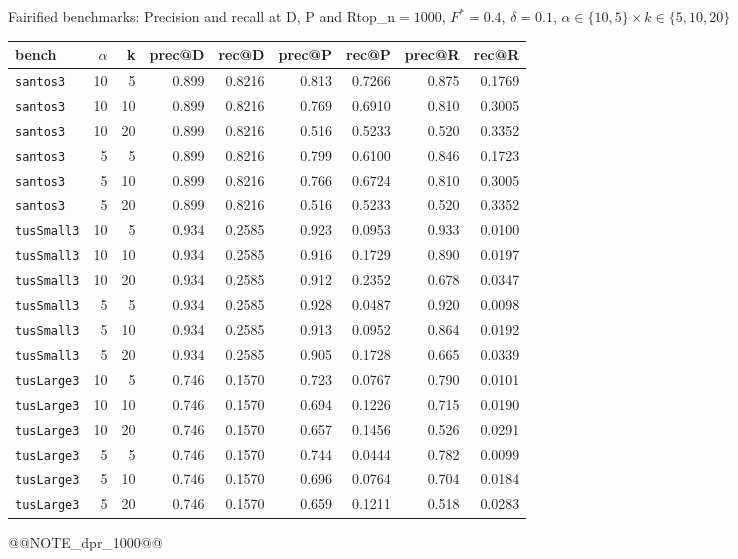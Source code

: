 \begin{frame}{Fairified benchmarks: Precision and recall at D, P and R}{top\_n$=1000$, $F^*{=}0.4$, $\delta{=}0.1$, $\alpha\in\{10,5\}\times k\in\{5,10,20\}$}
\tiny
\begin{center}
\setlength{\tabcolsep}{2.5pt}
\begin{tabular}{lrrrrrrrr}
\toprule
bench & $\alpha$ & k & prec@D & rec@D & prec@P & rec@P & prec@R & rec@R \\
\midrule
\texttt{santos3} & 10 & 5 & 0.899 & 0.8216 & 0.813 & 0.7266 & 0.875 & 0.1769 \\
\texttt{santos3} & 10 & 10 & 0.899 & 0.8216 & 0.769 & 0.6910 & 0.810 & 0.3005 \\
\texttt{santos3} & 10 & 20 & 0.899 & 0.8216 & 0.516 & 0.5233 & 0.520 & 0.3352 \\
\texttt{santos3} & 5 & 5 & 0.899 & 0.8216 & 0.799 & 0.6100 & 0.846 & 0.1723 \\
\texttt{santos3} & 5 & 10 & 0.899 & 0.8216 & 0.766 & 0.6724 & 0.810 & 0.3005 \\
\texttt{santos3} & 5 & 20 & 0.899 & 0.8216 & 0.516 & 0.5233 & 0.520 & 0.3352 \\
\texttt{tusSmall3} & 10 & 5 & 0.934 & 0.2585 & 0.923 & 0.0953 & 0.933 & 0.0100 \\
\texttt{tusSmall3} & 10 & 10 & 0.934 & 0.2585 & 0.916 & 0.1729 & 0.890 & 0.0197 \\
\texttt{tusSmall3} & 10 & 20 & 0.934 & 0.2585 & 0.912 & 0.2352 & 0.678 & 0.0347 \\
\texttt{tusSmall3} & 5 & 5 & 0.934 & 0.2585 & 0.928 & 0.0487 & 0.920 & 0.0098 \\
\texttt{tusSmall3} & 5 & 10 & 0.934 & 0.2585 & 0.913 & 0.0952 & 0.864 & 0.0192 \\
\texttt{tusSmall3} & 5 & 20 & 0.934 & 0.2585 & 0.905 & 0.1728 & 0.665 & 0.0339 \\
\texttt{tusLarge3} & 10 & 5 & 0.746 & 0.1570 & 0.723 & 0.0767 & 0.790 & 0.0101 \\
\texttt{tusLarge3} & 10 & 10 & 0.746 & 0.1570 & 0.694 & 0.1226 & 0.715 & 0.0190 \\
\texttt{tusLarge3} & 10 & 20 & 0.746 & 0.1570 & 0.657 & 0.1456 & 0.526 & 0.0291 \\
\texttt{tusLarge3} & 5 & 5 & 0.746 & 0.1570 & 0.744 & 0.0444 & 0.782 & 0.0099 \\
\texttt{tusLarge3} & 5 & 10 & 0.746 & 0.1570 & 0.696 & 0.0764 & 0.704 & 0.0184 \\
\texttt{tusLarge3} & 5 & 20 & 0.746 & 0.1570 & 0.659 & 0.1211 & 0.518 & 0.0283 \\
\bottomrule
\end{tabular}
\end{center}
@@NOTE_dpr_1000@@
\end{frame}

